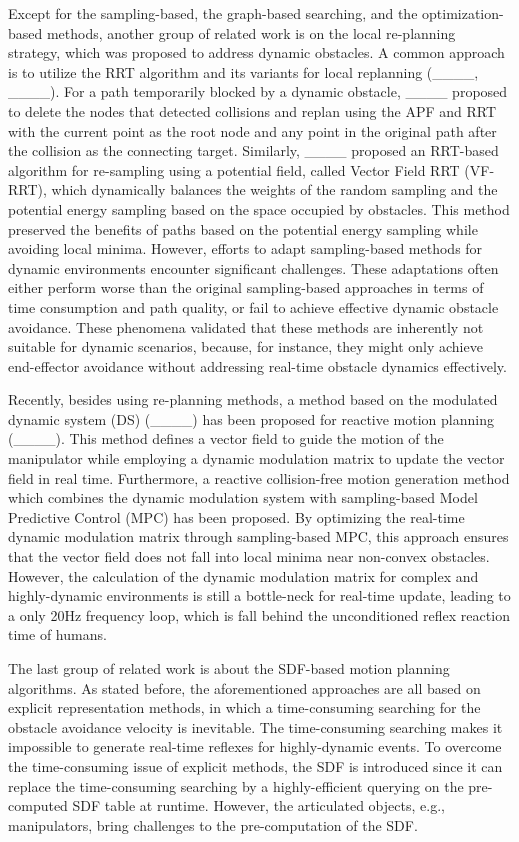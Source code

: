 Except for the sampling-based, the graph-based searching, and the optimization-based methods, another group of related work is on the local re-planning strategy, which was proposed to address dynamic obstacles. A common approach is to utilize the RRT algorithm and its variants for local replanning (____, ____). For a path temporarily blocked by a dynamic obstacle, ____ proposed to delete the nodes that detected collisions and replan using the APF and RRT with the current point as the root node and any point in the original path after the collision as the connecting target. Similarly, ____ proposed an RRT-based algorithm for re-sampling using a potential field, called Vector Field RRT (VF-RRT), which dynamically balances the weights of the random sampling and the potential energy sampling based on the space occupied by obstacles. This method preserved the benefits of paths based on the potential energy sampling while avoiding local minima. However, efforts to adapt sampling-based methods for dynamic environments encounter significant challenges. These adaptations often either perform worse than the original sampling-based approaches in terms of time consumption and path quality, or fail to achieve effective dynamic obstacle avoidance. These phenomena validated that these methods are inherently not suitable for dynamic scenarios, because, for instance, they might only achieve end-effector avoidance without addressing real-time obstacle dynamics effectively.

Recently, besides using re-planning methods, a method based on the modulated dynamic system (DS) (____) has been proposed for reactive motion planning (____). This method defines a vector field to guide the motion of the manipulator while employing a dynamic modulation matrix to update the vector field in real time. Furthermore, a reactive collision-free motion generation method which combines the dynamic modulation system with sampling-based Model Predictive Control (MPC) has been proposed. By optimizing the real-time dynamic modulation matrix through sampling-based MPC, this approach ensures that the vector field does not fall into local minima near non-convex obstacles. However, the calculation of the dynamic modulation matrix for complex and highly-dynamic environments is still a bottle-neck for real-time update, leading to a only 20Hz frequency loop, which is fall behind the unconditioned reflex reaction time of humans.

The last group of related work is about the SDF-based motion planning algorithms. As stated before, the aforementioned approaches are all based on explicit representation methods, in which a time-consuming searching for the obstacle avoidance velocity is inevitable. The time-consuming searching makes it impossible to generate real-time reflexes for highly-dynamic events. To overcome the time-consuming issue of explicit methods, the SDF is introduced since it can replace the time-consuming searching by a highly-efficient querying on the pre-computed SDF table at runtime. However, the articulated objects, e.g., manipulators, bring challenges to the pre-computation of the SDF.

